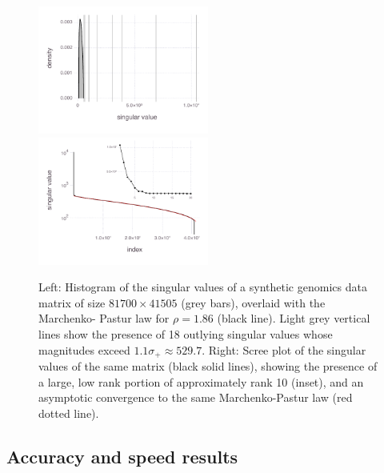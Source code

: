 \documentclass[final,leqno]{siamltex1213}
\begin{document}
\begin{figure}

\includegraphics[width=0.5\textwidth]{fig/synthetic/fig-empirical-density}
%
\includegraphics[width=0.5\textwidth]{fig/synthetic/fig-empirical-scree}

\caption{Left: Histogram of the singular values of a synthetic genomics data
matrix of size $81700\times41505$ (grey bars), overlaid with the Marchenko-
Pastur law for $\rho = 1.86$ (black line). Light grey vertical lines show the
presence of 18 outlying singular values whose magnitudes exceed
$1.1\sigma_+ \approx 529.7$.
Right: Scree plot of the singular values of the same matrix
(black solid lines), showing the presence of a large, low rank portion
of approximately rank 10 (inset), and an asymptotic convergence to the same
Marchenko-Pastur law (red dotted line).}
\label{fig:scree}
\end{figure}

\subsection{Accuracy and speed results}
\end{document}
